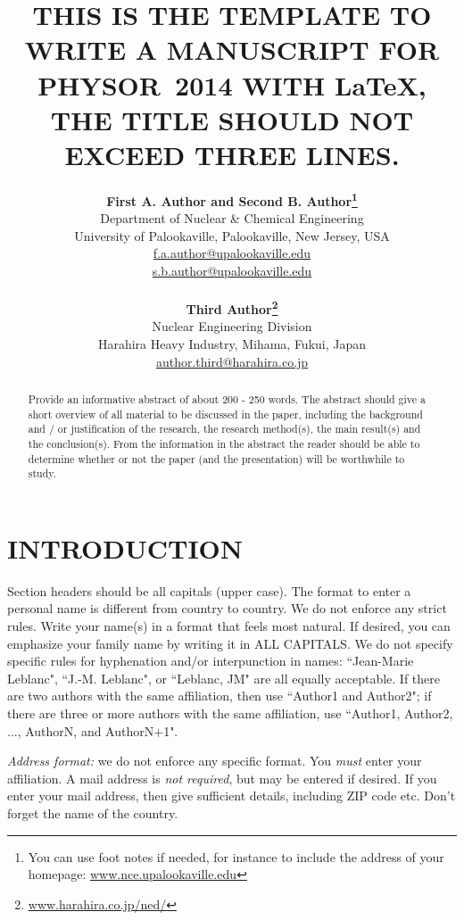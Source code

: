 \documentclass[12pt]{article}
\title{THIS IS THE TEMPLATE TO WRITE A MANUSCRIPT FOR PHYSOR~2014 WITH \LaTeX, THE TITLE SHOULD NOT EXCEED THREE LINES.}
\author{ 
  \textbf{First A. Author and Second B. Author\footnote{You can use foot notes if needed, for instance to include the address of your homepage: \href{http://www.nce.upalookaville.edu/}{www.nce.upalookaville.edu}}} \\
  Department of Nuclear \& Chemical Engineering \\
  University of Palookaville, Palookaville, New Jersey, USA\\
  \href{mailto:f.a.author@upalookaville.edu}{f.a.author@upalookaville.edu}\\
  \href{mailto:s.b.author@upalookaville.edu}{s.b.author@upalookaville.edu}\\
  \\                       %
  \textbf{Third Author\footnote{\href{http://www.harahira.co.jp/ned/}{www.harahira.co.jp/ned/}}} \\
  Nuclear Engineering Division \\
  Harahira Heavy Industry, Mihama, Fukui, Japan\\
  \href{mailto:author.third@harahira.co.jp}{author.third@harahira.co.jp}
}
\begin{document}


\maketitle

\begin{abstract}
  Provide an informative abstract of about 200 - 250 words. The abstract should give a short overview of all material to be discussed in the paper, including the background and / or justification of the research, the research method(s), the main result(s) and the conclusion(s). From the information in the abstract the reader should be able to determine whether or not the paper (and the presentation) will be worthwhile to study.
\end{abstract}


%
\section{INTRODUCTION}
\label{sect::intro}

Section headers should be all capitals (upper case). The format to enter a personal name is different from country to country. We do not enforce any strict rules. Write your name(s) in a format that feels most natural. If desired, you can emphasize your family name by writing it in ALL CAPITALS. We do not specify specific rules for hyphenation and/or interpunction in names: ``Jean-Marie Leblanc", ``J.-M. Leblanc", or ``Leblanc, JM" are all equally acceptable. If there are two authors with the same affiliation, then use ``Author1 and Author2"; if there are three or more authors with the same affiliation, use ``Author1, Author2, ..., AuthorN, and AuthorN+1".

\emph{Address format:} we do not enforce any specific format. You \emph{must} enter your affiliation. A mail address is \emph{not required}, but may be entered if desired. If you enter your mail address, then give sufficient details, including ZIP code etc. Don't forget the name of the country.
\end{document}
